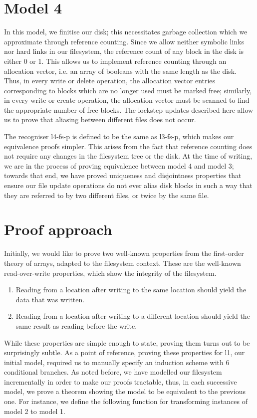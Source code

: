 \documentclass[format=sigconf,review=true]{acmart}
\begin{document}
\section{Model 4}
In this model, we finitise our disk; this necessitates garbage
collection which we approximate through reference
counting. Since we allow neither symbolic links nor hard links in our
filesystem, the reference count of any block in the disk is either 0
or 1. This allows us to implement reference counting through an
allocation vector, i.e. an array of booleans with the same length as
the disk. Thus, in every write or delete operation, the allocation
vector entries corresponding to blocks which are no longer used must
be marked free; similarly, in every write or create operation, the
allocation vector must be scanned to find the appropriate number of
free blocks. The lockstep updates described here allow us to prove
that aliasing between different files does not occur.

The recogniser l4-fs-p is defined to be the same as l3-fs-p, which
makes our equivalence proofs simpler. This arises from the fact that
reference counting does not require any changes in the filesystem tree
or the disk. At the time of writing, we are in the process of proving
equivalence between model 4 and model 3; towards that end, we have
proved uniqueness and disjointness properties that ensure our file
update operations do not ever alias disk blocks in such a way that
they are referred to by two different files, or twice by the same file.

\section {Proof approach}

Initially, we would like to prove two well-known properties from the
first-order theory of arrays, adapted to the filesystem context. These
are the well-known read-over-write properties, which show the
integrity of the filesystem.

\begin {enumerate}
\item Reading from a location after writing to the same location
  should yield the data that was written.
\item Reading from a location after writing to a different
  location should yield the same result as reading before the write.
\end {enumerate}

While these properties are simple enough to state, proving them turns
out to be surprisingly subtle. As a point of reference, proving these
properties for l1, our initial model, required us to manually specify
an induction scheme with 6 conditional branches. As noted
before, we have modelled our filesystem incrementally in order to make
our proofs tractable, thus, in each successive model, we prove a
theorem showing the model to be equivalent to the previous one. For
instance, we define the following function for transforming
instances of model 2 to model 1.
\end{document}
